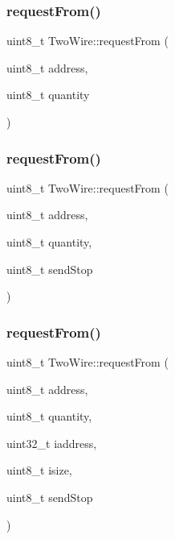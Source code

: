 \mbox{\label{class_two_wire_ae27d0936487551a05a1e9901bc456599}} 
\subsubsection{\texorpdfstring{request\+From()}{requestFrom()}\hspace{0.1cm}{\footnotesize\ttfamily [1/5]}}
{\footnotesize\ttfamily uint8\+\_\+t Two\+Wire\+::request\+From (\begin{DoxyParamCaption}\item[{uint8\+\_\+t}]{address,  }\item[{uint8\+\_\+t}]{quantity }\end{DoxyParamCaption})}

\mbox{\label{class_two_wire_a4b4b618531a04d5488a52583a3dfb173}} 
\subsubsection{\texorpdfstring{request\+From()}{requestFrom()}\hspace{0.1cm}{\footnotesize\ttfamily [2/5]}}
{\footnotesize\ttfamily uint8\+\_\+t Two\+Wire\+::request\+From (\begin{DoxyParamCaption}\item[{uint8\+\_\+t}]{address,  }\item[{uint8\+\_\+t}]{quantity,  }\item[{uint8\+\_\+t}]{send\+Stop }\end{DoxyParamCaption})}

\mbox{\label{class_two_wire_acd59cc9570fd49b1cf9044cbefef85ac}} 
\subsubsection{\texorpdfstring{request\+From()}{requestFrom()}\hspace{0.1cm}{\footnotesize\ttfamily [3/5]}}
{\footnotesize\ttfamily uint8\+\_\+t Two\+Wire\+::request\+From (\begin{DoxyParamCaption}\item[{uint8\+\_\+t}]{address,  }\item[{uint8\+\_\+t}]{quantity,  }\item[{uint32\+\_\+t}]{iaddress,  }\item[{uint8\+\_\+t}]{isize,  }\item[{uint8\+\_\+t}]{send\+Stop }\end{DoxyParamCaption})}


